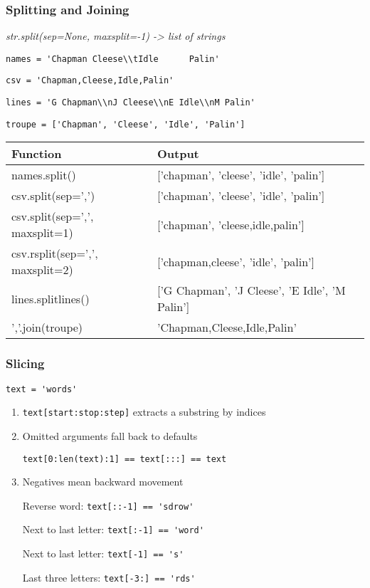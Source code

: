 \documentclass{beamer}
\begin{document}
%
%
\begin{frame}
  \frametitle{Splitting and Joining}

  \textit{str.split(sep=None, maxsplit=-1) -> list of strings}

  \lstinline{names = 'Chapman Cleese\\tIdle      Palin'}

  \lstinline{csv = 'Chapman,Cleese,Idle,Palin'}

  \lstinline{lines = 'G Chapman\\nJ Cleese\\nE Idle\\nM Palin'}

  \lstinline{troupe = ['Chapman', 'Cleese', 'Idle', 'Palin']}
  
  \begin{table}
    \begin{tabular}{l | l}
    Function & Output \\
    \hline
    names.split() & ['chapman', 'cleese', 'idle', 'palin'] \\
    csv.split(sep=',') & ['chapman', 'cleese', 'idle', 'palin'] \\
    csv.split(sep=',', maxsplit=1) & ['chapman', 'cleese,idle,palin'] \\
    csv.rsplit(sep=',', maxsplit=2) & ['chapman,cleese', 'idle', 'palin'] \\
    lines.splitlines() & ['G Chapman', 'J Cleese', 'E Idle', 'M Palin'] \\
    \hline
    ','.join(troupe) & 'Chapman,Cleese,Idle,Palin'
    \end{tabular}
  \end{table}
\end{frame}


%
%
\begin{frame}
  \frametitle{Slicing}

  \lstinline{text = 'words'}

  \begin{enumerate}
    \item \lstinline{text[start:stop:step]} extracts a substring by indices
    \item Omitted arguments fall back to defaults

      \lstinline{text[0:len(text):1] == text[:::] == text}

    \item Negatives mean backward movement
    
      Reverse word: \lstinline{text[::-1] == 'sdrow'}

      Next to last letter: \lstinline{text[:-1] == 'word'}

      Next to last letter: \lstinline{text[-1] == 's'}

      Last three letters: \lstinline{text[-3:] == 'rds'}


  \end{enumerate}

\end{frame}
\end{document}

